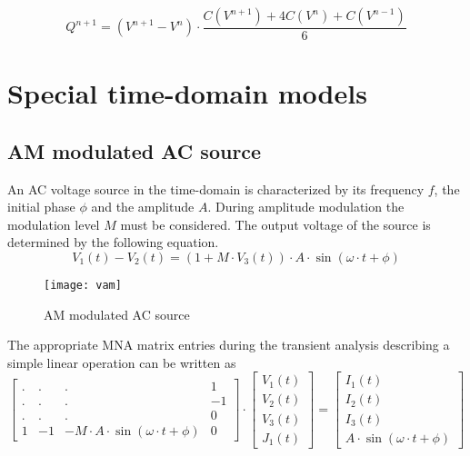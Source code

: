 \begin{equation}
Q^{n+1} = \left(V^{n+1} - V^{n}\right)\cdot \dfrac{C(V^{n+1}) + 4 C(V^{n}) + C(V^{n-1})}{6}
\end{equation}

\section{Special time-domain models}

\subsection{AM modulated AC source}

An AC voltage source in the time-domain is characterized by its
frequency $f$, the initial phase $\phi$ and the amplitude $A$.  During
amplitude modulation the modulation level $M$ must be considered.  The
output voltage of the source is determined by the following equation.
\begin{equation}
V_1\left(t\right) - V_2\left(t\right) = \left(1 + M\cdot V_3\left(t\right)\right)\cdot A\cdot \sin{\left(\omega\cdot t + \phi\right)}
\end{equation}

\begin{figure}[ht]
\begin{center}
\texttt{[image: vam]}
\end{center}
\label{fig:VAM}
\caption{AM modulated AC source}
\end{figure}
\FloatBarrier

The appropriate MNA matrix entries during the transient analysis
describing a simple linear operation can be written as
\begin{equation}
\begin{bmatrix}
. & . & . & 1\\
. & . & . & -1\\
. & . & . & 0\\
1 & -1 & -M\cdot A\cdot \sin{\left(\omega\cdot t + \phi\right)} & 0
\end{bmatrix}
\cdot
\begin{bmatrix}
V_1\left(t\right)\\
V_2\left(t\right)\\
V_3\left(t\right)\\
J_1\left(t\right)
\end{bmatrix}
=
\begin{bmatrix}
I_1\left(t\right)\\
I_2\left(t\right)\\
I_3\left(t\right)\\
A\cdot \sin{\left(\omega\cdot t + \phi\right)}
\end{bmatrix}
\end{equation}


